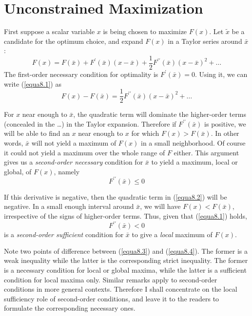 \section*{Unconstrained Maximization} 

First suppose a scalar variable $x$ is being chosen to maximize $F(x)$. Let $\tilde{x}$ be a candidate for the optimum choice, and expand $F(x)$ in a Taylor series around $\bar{x}$:
\begin{equation} \label{equa8.1}
F(x) = F(\bar{x}) + F^\prime(\bar{x})(x-\bar{x}) + \frac{1}{2} F^{\prime \prime}(\bar{x}) (x-\bar{x})^2 + \dots
\end{equation}
The first-order necessary condition for optimality is $F^\prime(\bar{x})=0$. Using it, we can write (\ref{equa8.1}) as
\begin{equation} \label{equa8.2}
F(x) - F(\bar{x}) =  \frac{1}{2} F^{\prime \prime}(\bar{x}) (x-\bar{x})^2 + \dots
\end{equation}

For $x$ near enough to $\bar{x}$, the quadratic term will dominate the higher-order terms (concealed in the \dots) in the Taylor expansion. Therefore if $F^{\prime \prime}(\bar{x})$ is positive, we will be able to find an $x$ near enough to $x$ for which $F(x)>F(\bar{x})$. In other words, $\bar{x}$ will not yield a maximum of $F(x)$ in a small neighborhood. Of course it could not yield a maximum over the whole range of $F$ either. This argument gives us a \textit{second-order necessary} condition for $\bar{x}$ to yield a maximum, local or global, of $F(x)$, namely
\begin{equation} \label{equa8.3}
F^{\prime \prime}(\bar{x}) \leq 0
\end{equation}

If this derivative is negative, then the quadratic term in (\ref{equa8.2}) will be negative. In a small enough interval around $\bar{x}$, we will have $F(x) < F(\bar{x})$, irrespective of the signs of higher-order terms. Thus, given that (\ref{equa8.1}) holds,
\begin{equation} \label{equa8.4}
F^{\prime \prime} (\bar{x}) < 0
\end{equation}
is a \textit{second-order sufficient} condition for $\bar{x}$ to give a \textit{local} maximum of $F(x)$.

Note two points of difference between (\ref{equa8.3}) and (\ref{equa8.4}). The former is a weak inequality while the latter is the corresponding strict inequality. The former is a necessary condition for local or global maxima, while the latter is a sufficient condition for local maxima only. Similar remarks apply to second-order conditions in more general contexts. Therefore I shall concentrate on the local sufficiency role of second-order conditions, and leave it to the readers to formulate the corresponding necessary ones.

